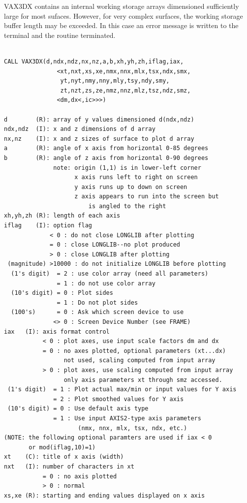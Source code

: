 \documentclass[11pt]{report}
\begin{document}
VAX3DX contains an internal working storage arrays dimensioned sufficiently
large for most sufaces.  However, for very complex surfaces, the working
storage buffer length may be exceeded.  In this case
an error message is written to the terminal and the routine terminated.
\begin{verbatim}

CALL VAX3DX(d,ndx,ndz,nx,nz,a,b,xh,yh,zh,iflag,iax,
               <xt,nxt,xs,xe,nmx,nnx,mlx,tsx,ndx,smx,
                yt,nyt,nmy,nny,mly,tsy,ndy,smy,
                zt,nzt,zs,ze,nmz,nnz,mlz,tsz,ndz,smz,
               <dm,dx<,ic>>>)

d        (R): array of y values dimensioned d(ndx,ndz)
ndx,ndz  (I): x and z dimensions of d array
nx,nz    (I): x and z sizes of surface to plot d array
a        (R): angle of x axis from horizontal 0-85 degrees
b        (R): angle of z axis from horizontal 0-90 degrees
              note: origin (1,1) is in lower-left corner
                    x axis runs left to right on screen
                    y axis runs up to down on screen
                    z axis appears to run into the screen but
                        is angled to the right
xh,yh,zh (R): length of each axis
iflag    (I): option flag
             < 0 : do not close LONGLIB after plotting
             = 0 : close LONGLIB--no plot produced
             > 0 : close LONGLIB after plotting
 (magnitude) >10000 : do not initialize LONGLIB before plotting
  (1's digit)  = 2 : use color array (need all parameters)
               = 1 : do not use color array
  (10's digit) = 0 : Plot sides
               = 1 : Do not plot sides
  (100's)      = 0 : Ask which screen device to use
              <> 0 : Screen Device Number (see FRAME)
iax   (I): axis format control
           < 0 : plot axes, use input scale factors dm and dx
           = 0 : no axes plotted, optional parameters (xt...dx) 
                 not used, scaling computed from input array
           > 0 : plot axes, use scaling computed from input array
                 only axis parameters xt through smz accessed.
 (1's digit)  = 1 : Plot actual max/min or input values for Y axis
              = 2 : Plot smoothed values for Y axis
 (10's digit) = 0 : Use default axis type
              = 1 : Use input AXIS2-type axis parameters
                     (nmx, nnx, mlx, tsx, ndx, etc.)
(NOTE: the following optional paramters are used if iax < 0 
       or mod(iflag,10)=1)
xt    (C): title of x axis (width)
nxt   (I): number of characters in xt
           = 0 : no axis plotted
           > 0 : normal
xs,xe (R): starting and ending values displayed on x axis

\end{verbatim}
\end{document}
